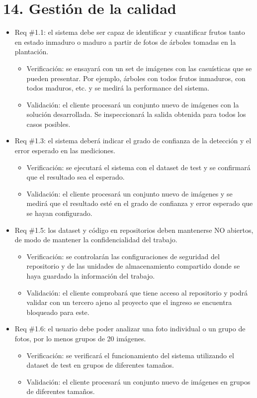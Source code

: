 \documentclass[
11pt %
]{charter}
\begin{document}
\section{14. Gestión de la calidad}
\label{sec:calidad}
\begin{itemize}
\item Req \#1.1: el sistema debe ser capaz de identificar y cuantificar frutos tanto en estado inmaduro o maduro a partir de fotos de árboles tomadas en la plantación.
	\begin{itemize}
	\item Verificación: se ensayará con un set de imágenes con las casuísticas que se pueden presentar. Por ejemplo, árboles con todos frutos inmaduros, con todos maduros, etc. y se medirá la performance del sistema.
	\item Validación: el cliente procesará un conjunto nuevo de imágenes con la
solución desarrollada. Se inspeccionará la salida obtenida para todos los casos posibles.
	\end{itemize}

\item Req \#1.3: el sistema deberá indicar el grado de confianza de la detección y el error esperado en las mediciones.
	\begin{itemize}
	\item Verificación: se ejecutará el sistema con el dataset de test y se confirmará que el resultado sea el esperado.
	\item Validación: el cliente procesará un conjunto nuevo de imágenes y se medirá que el resultado esté en el grado de confianza y error esperado que se hayan configurado.
	\end{itemize}

\item Req \#1.5: los dataset y código en repositorios deben mantenerse NO abiertos, de modo de mantener la confidencialidad del trabajo.
	\begin{itemize}
	\item Verificación: se controlarán las configuraciones de seguridad del repositorio y de las unidades de almacenamiento compartido donde se haya guardado la información del
trabajo.
	\item Validación: el cliente comprobará que tiene acceso al repositorio y podrá validar con un tercero ajeno al proyecto que el ingreso se encuentra bloqueado para este.
	\end{itemize}

\item Req \#1.6: el usuario debe poder analizar una foto individual o un grupo de fotos, por lo menos grupos de 20 imágenes.
	\begin{itemize}
	\item Verificación: se verificará el funcionamiento del sistema utilizando el dataset de test en grupos de diferentes tamaños.
	\item Validación: el cliente procesará un conjunto nuevo de imágenes en grupos de diferentes tamaños.
	\end{itemize}


\end{itemize}
\end{document}
